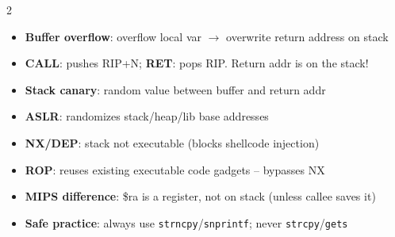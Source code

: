 \documentclass[11pt, letterpaper]{article}
\begin{document}
\vspace{4pt}

\begin{tcolorbox}[colback=part6bg, colframe=sectionred,
  title={\bfseries x86-64 Stack \& Memory Security}, arc=3pt, boxrule=1pt]
\footnotesize
\begin{multicols}{2}
\begin{itemize}[noitemsep, leftmargin=*]
  \item \textbf{Buffer overflow}: overflow local var $\to$ overwrite return address on stack
  \item \textbf{CALL}: pushes RIP+N; \textbf{RET}: pops RIP. Return addr is on the stack!
  \item \textbf{Stack canary}: random value between buffer and return addr
  \item \textbf{ASLR}: randomizes stack/heap/lib base addresses
\end{itemize}
\columnbreak
\begin{itemize}[noitemsep, leftmargin=*]
  \item \textbf{NX/DEP}: stack not executable (blocks shellcode injection)
  \item \textbf{ROP}: reuses existing executable code gadgets -- bypasses NX
  \item \textbf{MIPS difference}: \$ra is a register, not on stack (unless callee saves it)
  \item \textbf{Safe practice}: always use \texttt{strncpy}/\texttt{snprintf}; never \texttt{strcpy}/\texttt{gets}
\end{itemize}
\end{multicols}
\end{tcolorbox}

\vspace{4pt}
\end{document}
